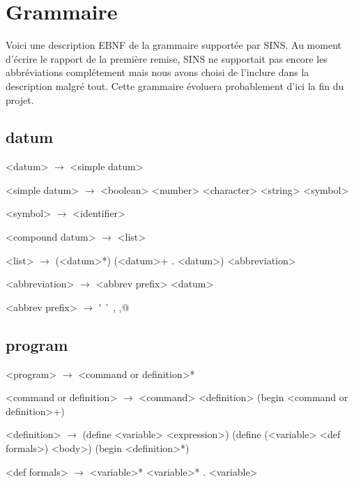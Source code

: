 \documentclass[10pt]{article}
\begin{document}
\setlength{\grammarindent}{3em}

\section*{Grammaire}
Voici une description EBNF de la grammaire supportée par SINS. Au moment d'écrire le rapport de la première remise, SINS ne supportait pas encore les abbréviations complétement mais nous avons choisi de l'inclure dans la description malgré tout. Cette grammaire évoluera probablement d'ici la fin du projet.

\subsection*{datum}

\begin{grammar}
  <datum> $\longrightarrow$ <simple datum> 

  <simple datum> $\longrightarrow$ <boolean> \alt <number>
  \alt <character> \alt <string> \alt <symbol>

  <symbol> $\longrightarrow$ <identifier>

  <compound datum> $\longrightarrow$ <list>

  <list> $\longrightarrow$ (<datum>*) \alt (<datum>+  .  <datum>)
  \alt <abbreviation>

  <abbreviation> $\longrightarrow$ <abbrev prefix> <datum>

  <abbrev prefix> $\longrightarrow$ \'{} \alt \`{} \alt , \alt ,@
  
\end{grammar}

\subsection*{program}

\begin{grammar}
  <program> $\longrightarrow$ <command or definition>*
  
  <command or definition> $\longrightarrow$ <command>
  \alt <definition>
  \alt (begin <command or definition>+)

  <definition> $\longrightarrow$ (define <variable> <expression>)
  \alt (define (<variable> <def formals>) <body>)
  \alt (begin <definition>*)

  <def formals> $\longrightarrow$ <variable>*
  \alt <variable>*  .  <variable>
\end{grammar}
\end{document}
